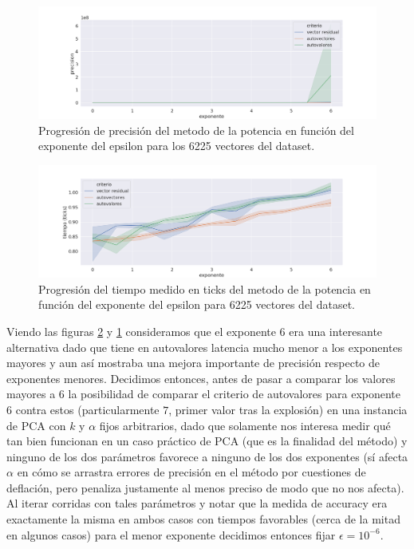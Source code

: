 \begin{figure}[h]
\includegraphics[width=\textwidth]{./img/precision_corto_full.png}
\centering
\caption{Progresión de precisión del metodo de la potencia en función del exponente del epsilon para los 6225 vectores del dataset. \label{fig:pm_c_p}}
\end{figure}

\begin{figure}[h]
\includegraphics[width=\textwidth]{./img/tiempo_corto_full.png}
\centering
\caption{Progresión del tiempo medido en ticks del metodo de la potencia en función del exponente del epsilon para 6225 vectores del dataset. \label{fig:pm_c_t}}
\end{figure}

Viendo las figuras \ref{fig:pm_c_t} y \ref{fig:pm_c_p} consideramos que el exponente $6$ era una interesante alternativa dado que tiene en autovalores latencia mucho menor a los exponentes mayores y aun así mostraba una mejora importante de precisión respecto de exponentes menores. Decidimos entonces, antes de pasar a comparar los valores mayores a $6$ la posibilidad de comparar el criterio de autovalores para exponente $6$ contra estos (particularmente $7$, primer valor tras la explosión) en una instancia de PCA con $k$ y $\alpha$ fijos arbitrarios, dado que solamente nos interesa medir qué tan bien funcionan en un caso práctico de PCA (que es la finalidad del método) y ninguno de los dos parámetros favorece a ninguno de los dos exponentes (sí afecta $\alpha$ en cómo se arrastra errores de precisión en el método por cuestiones de deflación, pero penaliza justamente al menos preciso de modo que no nos afecta). Al iterar corridas con tales parámetros y notar que la medida de accuracy era exactamente la misma en ambos casos con tiempos favorables (cerca de la mitad en algunos casos) para el menor exponente decidimos entonces fijar $\epsilon=10^{-6}$.
